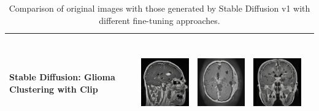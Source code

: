 \begin{table}[H]
\begin{tabularx}{\linewidth}{@{}>{\centering\arraybackslash}m{3cm}>{\centering\arraybackslash}X>{\centering\arraybackslash}X>{\centering\arraybackslash}X>{\centering\arraybackslash}X@{}}
\midrule
Stable Diffusion: Glioma Clustering with Clip & 
\includegraphics[valign=M,width=\linewidth,height=4cm,keepaspectratio]{main/content/images/brain_dreambooth_comparison/cluster_clip/image3.png} & 
\includegraphics[valign=M,width=\linewidth,height=4cm,keepaspectratio]{main/content/images/brain_dreambooth_comparison/cluster_clip/image0.png} & 
\includegraphics[valign=M,width=\linewidth,height=4cm,keepaspectratio]{main/content/images/brain_dreambooth_comparison/cluster_clip/image1.png} \\
\bottomrule
\end{tabularx}
\caption{Comparison of original images with those generated by Stable Diffusion v1 with different fine-tuning approaches.}
\label{tab:brain_image_comparison_dreambooth_combined}
\end{table}

